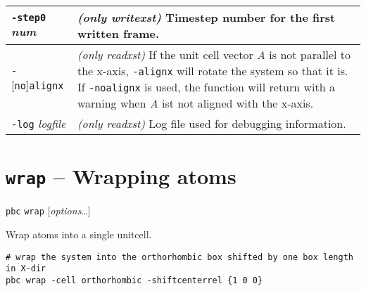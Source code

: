 \documentclass[a4paper, DIV12]{scrartcl}
\begin{document}
\begin{tabular}{|p{}|p{}|}
\texttt{-step0} \textit{num}
& \emph{(only writexst)} Timestep number for the first written frame.
\\ \hline

\texttt{-}[\texttt{no}]\texttt{alignx}
& \emph{(only readxst)} If the unit cell vector \textit{A} is not
parallel to the x-axis, \texttt{-alignx} will rotate the system so that it is. If
\texttt{-noalignx} is used, the function will return with a warning
when \textit{A} ist not aligned with the x-axis.
\\ \hline

\texttt{-log} \textit{logfile}
& \emph{(only readxst)} Log file used for debugging information.
\\ \hline
\end{tabular}

\newpage
\section{\texttt{wrap} -- Wrapping atoms}
\label{sec:wrap}


\texttt{pbc} \texttt{wrap} [\textit{options}\dots]


Wrap atoms into a single unitcell.


\begin{Verbatim}
# wrap the system into the orthorhombic box shifted by one box length in X-dir
pbc wrap -cell orthorhombic -shiftcenterrel {1 0 0}
\end{Verbatim}


\end{document}

